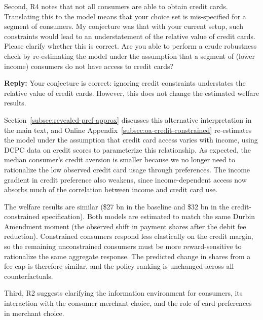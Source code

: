 \documentclass[main.tex]{subfiles}
\begin{document}
\begin{refsection}
\begin{refcommentnoclear}
Second, R4 notes that not all consumers are able to obtain credit cards.
Translating this to the model means that your choice set is mis-specified for a segment of consumers.
My conjecture was that with your current setup, such constraints would lead to an understatement of the relative value of credit cards.
Please clarify whether this is correct.
Are you able to perform a crude robustness check by re-estimating the model under the assumption that a segment of (lower income) consumers do not have access to credit cards?

\end{refcommentnoclear}

\textbf{Reply:} Your conjecture is correct: ignoring credit constraints understates the relative value of credit cards.
However, this does not change the estimated welfare results.

Section~\ref{subsec:revealed-pref-approx} discusses this alternative interpretation in the main text, and Online Appendix~\ref{subsec:oa-credit-constrained} re-estimates the model under the assumption that credit card access varies with income, using DCPC data on credit scores to parameterize this relationship.
As expected, the median consumer's credit aversion is smaller because we no longer need to rationalize the low observed credit card usage through preferences.
The income gradient in credit preference also weakens, since income-dependent access now absorbs much of the correlation between income and credit card use.

The welfare results are similar (\$27 bn in the baseline and \$32 bn in the credit-constrained specification).
Both models are estimated to match the same Durbin Amendment moment (the observed shift in payment shares after the debit fee reduction).
Constrained consumers respond less elastically on the credit margin, so the remaining unconstrained consumers must be more reward-sensitive to rationalize the same aggregate response.
The predicted change in shares from a fee cap is therefore similar, and the policy ranking is unchanged across all counterfactuals.

\begin{refcommentnoclear}
Third, R2 suggests clarifying the information environment for consumers, its interaction with the consumer merchant choice, and the role of card preferences in merchant choice.
\end{refcommentnoclear}


\end{refsection}
\end{document}
